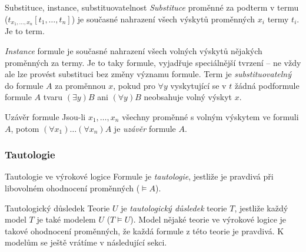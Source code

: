 \begin{definiceN}{Substituce, instance, substituovatelnost}
\emph{Substituce} proměnné za podterm v termu ($t_{x_1,\dots,x_n}[t_1,\dots,t_n]$) je současné nahrazení všech výskytů proměnných $x_i$ termy $t_i$. Je to term. 

\emph{Instance} formule je současné nahrazení všech volných výskytů nějakých proměnných za termy. Je to taky formule, vyjadřuje speciálnější tvrzení -- ne vždy ale lze provést substituci bez změny významu formule. Term je \emph{substituovatelný} do formule $A$ za proměnnou $x$, pokud pro $\forall y$ vyskytující se v $t$ žádná podformule formule $A$ tvaru $(\exists y)B$ ani $(\forall y)B$ neobsahuje volný výskyt $x$.
\end{definiceN}

\begin{definiceN}{Uzávěr formule}
Jsou-li $x_1,\dots,x_n$ všechny proměnné s volným výskytem ve formuli $A$, potom $(\forall x_1)\dots(\forall x_n)A$ je \emph{uzávěr} formule $A$.
\end{definiceN}

\subsubsection*{Tautologie}

\begin{definiceN}{Tautologie ve výrokové logice}
Formule je \emph{tautologie}, jestliže je pravdivá při libovolném ohodnocení proměnných ($\models A$).
\end{definiceN}

\begin{definiceN}{Tautologický důsledek}
Teorie $U$ je \emph{tautologický důsledek} teorie $T$, jestliže každý model $T$ je také modelem $U$ ($T\models U$). Model nějaké teorie ve výrokové logice je takové ohodnocení proměnných, že každá formule z této teorie je pravdivá. K modelům se ještě vrátíme v následující sekci.
\end{definiceN}



